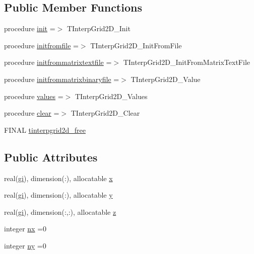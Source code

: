 \subsection*{Public Member Functions}
\begin{DoxyCompactItemize}
\item 
procedure \mbox{\hyperlink{structinterpolation_1_1tinterpgrid2d_abc095cf68c395b202c78a510d20c7211}{init}} =$>$ T\+Interp\+Grid2\+D\+\_\+\+Init
\item 
procedure \mbox{\hyperlink{structinterpolation_1_1tinterpgrid2d_a0f3fb228e8f9ef8c79dba9d23e5737e4}{initfromfile}} =$>$ T\+Interp\+Grid2\+D\+\_\+\+Init\+From\+File
\item 
procedure \mbox{\hyperlink{structinterpolation_1_1tinterpgrid2d_a14ce003065fbe2c234389d1fd65402d3}{initfrommatrixtextfile}} =$>$ T\+Interp\+Grid2\+D\+\_\+\+Init\+From\+Matrix\+Text\+File
\item 
procedure \mbox{\hyperlink{structinterpolation_1_1tinterpgrid2d_ac945ddb64e08ace4c39a4f2e89e28582}{initfrommatrixbinaryfile}} =$>$ T\+Interp\+Grid2\+D\+\_\+\+Value
\item 
procedure \mbox{\hyperlink{structinterpolation_1_1tinterpgrid2d_a25296677121ca98de380290362de4160}{values}} =$>$ T\+Interp\+Grid2\+D\+\_\+\+Values
\item 
procedure \mbox{\hyperlink{structinterpolation_1_1tinterpgrid2d_af86d878efd2948fcd9db1df2d2c16b58}{clear}} =$>$ T\+Interp\+Grid2\+D\+\_\+\+Clear
\item 
F\+I\+N\+AL \mbox{\hyperlink{structinterpolation_1_1tinterpgrid2d_a1b4998551f05072a98566d928a67277c}{tinterpgrid2d\+\_\+free}}
\end{DoxyCompactItemize}
\subsection*{Public Attributes}
\begin{DoxyCompactItemize}
\item 
real(\mbox{\hyperlink{namespaceinterpolation_a7242dea48715e8170bae81efe12c64be}{gi}}), dimension(\+:), allocatable \mbox{\hyperlink{structinterpolation_1_1tinterpgrid2d_a6e05188009018b495db7f12e2749b276}{x}}
\item 
real(\mbox{\hyperlink{namespaceinterpolation_a7242dea48715e8170bae81efe12c64be}{gi}}), dimension(\+:), allocatable \mbox{\hyperlink{structinterpolation_1_1tinterpgrid2d_a5a7e39cc77241b6edab46dd4bb3732b7}{y}}
\item 
real(\mbox{\hyperlink{namespaceinterpolation_a7242dea48715e8170bae81efe12c64be}{gi}}), dimension(\+:,\+:), allocatable \mbox{\hyperlink{structinterpolation_1_1tinterpgrid2d_ae77e52e5af5db7d55e24b8cb291ffbcb}{z}}
\item 
integer \mbox{\hyperlink{structinterpolation_1_1tinterpgrid2d_a9a3039dcac42362201c4468a82f2e148}{nx}} =0
\item 
integer \mbox{\hyperlink{structinterpolation_1_1tinterpgrid2d_a66924b0d8f66ed0b2fa38745e795598f}{ny}} =0
\end{DoxyCompactItemize}
